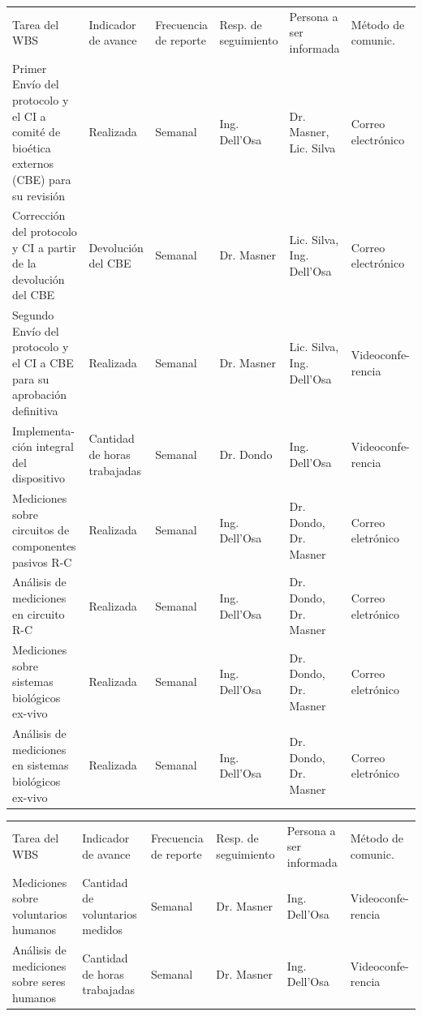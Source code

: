 \documentclass[11pt]{charter}
\begin{document}
\begin{table}[H]
\centering
\begin{tabularx}{\linewidth}{@{}|X|X|X|X|X|X|@{}}
\hline
\rowcolor[HTML]{C0C0C0} 
\multicolumn{6}{|c|}{\cellcolor[HTML]{C0C0C0}SEGUIMIENTO DE AVANCE}                                                                       \\ \hline
\rowcolor[HTML]{C0C0C0} 
Tarea del WBS & Indicador de avance & Frecuencia de reporte & Resp. de seguimiento & Persona a ser informada & Método de comunic. \\ \hline
Primer Envío del protocolo y el CI a comité de bioética externos (CBE) para su revisión & Realizada & Semanal & Ing. Dell'Osa & Dr. Masner, Lic. Silva & Correo electrónico \\ \hline
Corrección del protocolo y CI a partir de la devolución del CBE & Devolución del CBE  & Semanal & Dr. Masner & Lic. Silva, Ing. Dell'Osa & Correo electrónico \\ \hline
Segundo Envío del protocolo y el CI a CBE para su aprobación definitiva & Realizada  & Semanal & Dr. Masner & Lic. Silva, Ing. Dell'Osa & Videoconfe- rencia \\ \hline
Implementa- ción integral del dispositivo & Cantidad de horas trabajadas & Semanal & Dr. Dondo & Ing. Dell'Osa & Videoconfe- rencia \\ \hline
Mediciones sobre circuitos de componentes pasivos R-C & Realizada & Semanal & Ing. Dell'Osa & Dr. Dondo, Dr. Masner & Correo eletrónico \\ \hline
Análisis de mediciones en circuito R-C & Realizada & Semanal & Ing. Dell'Osa & Dr. Dondo, Dr. Masner & Correo eletrónico \\ \hline
Mediciones sobre sistemas biológicos ex-vivo & Realizada & Semanal & Ing. Dell'Osa &  Dr. Dondo, Dr. Masner & Correo eletrónico  \\ \hline
Análisis de mediciones en sistemas biológicos ex-vivo & Realizada & Semanal & Ing. Dell'Osa  &  Dr. Dondo, Dr. Masner & Correo eletrónico  \\ \hline
\end{tabularx}%
\end{table}

\begin{table}[H]
\centering
\begin{tabularx}{\linewidth}{@{}|X|X|X|X|X|X|@{}}
\hline
\rowcolor[HTML]{C0C0C0} 
\multicolumn{6}{|c|}{\cellcolor[HTML]{C0C0C0}SEGUIMIENTO DE AVANCE}                                                                       \\ \hline
\rowcolor[HTML]{C0C0C0} 
Tarea del WBS & Indicador de avance & Frecuencia de reporte & Resp. de seguimiento & Persona a ser informada & Método de comunic. \\ \hline
Mediciones sobre voluntarios humanos  & Cantidad de voluntarios medidos & Semanal & Dr. Masner & Ing. Dell'Osa & Videoconfe- rencia \\ \hline
Análisis de mediciones sobre seres humanos & Cantidad de horas trabajadas & Semanal & Dr. Masner &  Ing. Dell'Osa & Videoconfe- rencia  \\ \hline
\end{tabularx}%
\end{table}
\end{document}
